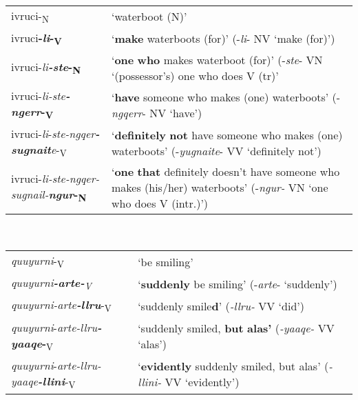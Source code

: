 \documentclass[output=paper]{langscibook}
\begin{document}
\ea\label{ex:key:9} \citet[542]{Woodbury2017}\\
\begin{tabular}{p{5.5cm}p{5.2cm}}
     ivruci-\textsubscript{N}  &    `waterboot (N)' \\
     ivruci\textbf{{}-}\textbf{\textit{li}}\textbf{{}-}\textbf{\textsubscript{V}}  &    `\textbf{make} waterboots (for)' (-\textit{li}{}- NV `make (for)') \\
     ivruci-\textit{li}\textbf{\textit{{}-ste}}\textbf{{}-}\textbf{\textsubscript{N}}  &    `\textbf{one} \textbf{who} makes waterboot (for)' (-\textit{ste}{}- VN `(possessor's) one who does V (tr)' \\
     ivruci-\textit{li-ste}\textbf{\textit{{}-ngerr}}\textbf{{}-}\textbf{\textsubscript{V}}  &    `\textbf{have} someone who makes (one) waterboots' (-\textit{ngqerr}{}- NV `have') \\
      ivruci-\textit{li}{}-\textit{ste-ngqer}\textbf{\textit{{}-sugnait}}\textit{e}{}-\textsubscript{V}  &    `\textbf{definitely} \textbf{not} have someone who makes (one) waterboots' (-\textit{yugnaite}{}- VV `definitely not') \\
      ivruci-\textit{li-ste-ngqer-sugnail-}\textbf{\textit{ngur}}\textbf{{}-}\textbf{\textsubscript{N}}  &    `\textbf{one} \textbf{that} definitely doesn't have someone who makes (his/her) waterboots' (-\textit{ngur-} VN `one who does V (intr.)') \\
\end{tabular}
\z

\ea\label{ex:key:10} {\citet[542]{Woodbury2017}}\\
\begin{tabular}{p{5.5cm}p{5.2cm}}
    \textit{quuyurni}{}-\textsubscript{V}  &    `be smiling' \\
    \textit{quuyurni}\textbf{\textit{{}-arte{}-}}\textit{\textsubscript{V}}  &    `\textbf{suddenly} be smiling' (-\textit{arte}{}- `suddenly') \\
    \textit{quuyurni-arte}\textbf{\textit{{}-llru}}{}-\textsubscript{V}  &    `suddenly smile\textbf{d}' (\textit{{}-llru-} VV `did') \\
    \textit{quuyurni}{}-\textit{arte-llru}\textbf{\textit{{}-yaaqe}}\textbf{{}-}\textsubscript{V}  &    `suddenly smiled, \textbf{but} \textbf{alas'} (\textit{{}-yaaqe-} VV `alas') \\
     \textit{quuyurni}{}-\textit{arte-llru-yaaqe}\textbf{\textit{{}-llini}}{}-\textsubscript{V}  &    `\textbf{evidently} suddenly smiled, but alas' (\textit{{}-llini-} VV `evidently') \\
\end{tabular}
\z
\end{document}
